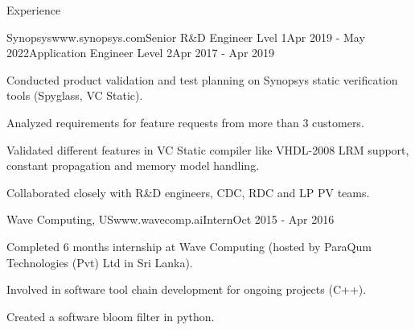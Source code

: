 \documentclass[
11pt, %
]{./assets/resume} %
\begin{document}
\begin{rSection}{Experience}
\begin{rSubsectionM}{Synopsys}{www.synopsys.com}{Senior R\&D Engineer Lvel 1}{Apr 2019 - May 2022}{Application Engineer Level 2}{Apr 2017 - Apr 2019}{}{}
		\item Conducted product validation and test planning on Synopsys static verification tools (Spyglass, VC Static).
		\item Analyzed requirements for feature requests from more than 3 customers.
		\item Validated different features in VC Static compiler like VHDL-2008 LRM support, constant propagation and memory model handling.
		\item Collaborated closely with R\&D engineers, CDC, RDC and LP PV teams.
	\end{rSubsectionM}
	\begin{rSubsectionX}{Wave Computing, US}{www.wavecomp.ai}{Intern}{Oct 2015 - Apr 2016}
		\item Completed 6 months internship at Wave Computing (hosted by ParaQum Technologies (Pvt) Ltd in Sri Lanka).
		\item Involved in software tool chain development for ongoing projects (C++).
		\item Created a software bloom filter in python.
	\end{rSubsectionX}
	
\end{rSection}


	
\end{document}
